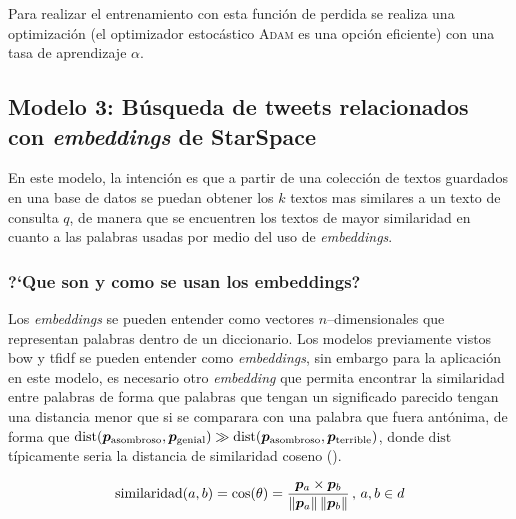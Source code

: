 Para realizar el entrenamiento con esta función de perdida se realiza una optimización (el optimizador estocástico \textsc{Adam} \cite{Kingma2014} es una opción eficiente) con una tasa de aprendizaje $\alpha$.


\subsection{Modelo 3: Búsqueda de tweets relacionados con \emph{embeddings} de \mbox{StarSpace}}
En este modelo, la intención es que a partir de una colección de textos guardados en una base de datos se puedan obtener los $k$ textos mas similares a un texto de consulta $q$, de manera que se encuentren los textos de mayor similaridad en cuanto a las palabras usadas por medio del uso de \emph{embeddings}.


\subsubsection{?`Que son y como se usan los embeddings?}
Los \emph{embeddings} se pueden entender como vectores $n$--dimensionales que representan palabras dentro de un diccionario. Los modelos previamente vistos \gls{bow} y \gls{tfidf} se pueden entender como \emph{embeddings}, sin embargo para la aplicación en este modelo, es necesario otro \emph{embedding} que permita encontrar la similaridad entre palabras de forma que palabras que tengan un significado parecido tengan una distancia menor que si se comparara con una palabra que fuera antónima, de forma que $\mathrm{dist}({\bm{p}}_{\mathrm{asombroso}}, {\bm{p}}_{\mathrm{genial}}) \gg \mathrm{dist}({\bm{p}}_{\mathrm{asombroso}}, {\bm{p}}_{\mathrm{terrible}})$, donde $\mathrm{dist}$ típicamente seria la distancia de similaridad coseno ().

\begin{equation} \label{eq:cosine-similarity}
  \mathrm{similaridad}(a, b) = \cos(\theta) = \frac{{\bm{p}}_a \times {\bm{p}}_b}{\left\lVert{\bm{p}}_a\right\rVert \left\lVert{\bm{p}}_b\right\rVert} \,,\, a, b \in d
\end{equation}

